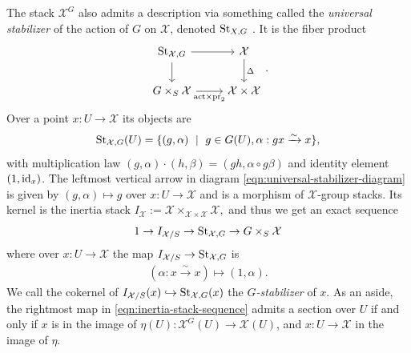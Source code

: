 \documentclass[12pt,dvipsnames]{amsart}
\begin{document}
The stack \(\mathcal X^G\) also admits a description via something called the \emph{universal stabilizer} of the action of $G$ on $\mathcal X$, denoted \(\operatorname{St}_{X,G}\) \cite[Section 4.1]{romagny_AlgebraicitySmoothnessFixed2022}. It is the fiber product
\begin{equation}\label{eqn:universal-stabilizer-diagram}
\begin{tikzcd}
  \St_{\mathcal X,G} \arrow[d]\arrow[r]& \mathcal X \arrow[d,"\Delta"] \\
  G\times_S \mathcal X\arrow[r,swap,"\text{act}\times \pr_2"]&\mathcal X\times \mathcal X
\end{tikzcd}.
\end{equation}
Over a point \(x:U\to \mathcal X\) its objects are
\begin{align*}
  \operatorname{St}_{\mathcal X,G}(U) = \{(g,\alpha) ~\mid~ g\in G(U), \alpha:gx\xrightarrow{\sim} x\},
\end{align*}
with multiplication law \((g,\alpha) \cdot (h,\beta) = (gh, \alpha \circ g\beta)\) and identity element \((1,\operatorname{id}_x)\). The leftmost vertical arrow in diagram \eqref{eqn:universal-stabilizer-diagram} is given by \((g,\alpha) \mapsto g\) over \(x:U\to \mathcal X\) and is a morphism of \(\mathcal X\)-group stacks. Its kernel is the inertia stack \(I_{\mathcal X} := \mathcal X\times_{\mathcal X\times \mathcal X}\mathcal X,\) and thus we get an exact sequence
\begin{equation}
  \label{eqn:inertia-stack-sequence}
  1 \to I_{\mathcal X/S} \to \operatorname{St}_{\mathcal X,G} \to G\times_S \mathcal X
\end{equation}
where over \(x:U\to \mathcal X\) the map \(I_{\mathcal X/S}\to \operatorname{St}_{\mathcal X, G}\) is
\begin{align*}
  (\alpha:x\xrightarrow{\sim} x) \mapsto (1, \alpha).
\end{align*}
We call the cokernel of \(I_{\mathcal X/S}(x)\hookrightarrow \operatorname{St}_{\mathcal X, G}(x)\) the \emph{\(G\)-stabilizer} of \(x\). As an aside, the rightmost map in \eqref{eqn:inertia-stack-sequence} admits a section over \(U\) if and only if \(x\) is in the image of \(\eta(U):\mathcal X^G(U)\to \mathcal X(U)\), and \(x:U\to \mathcal X\) in the image of \(\eta\).
\begin{remark}
\end{remark}
\end{document}
